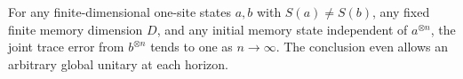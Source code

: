 \begin{proposition}\label{prop:entropy-density}
For any finite-dimensional one-site states $a,b$ with $S(a)\ne S(b)$, any fixed finite memory dimension $D$, and any initial memory state independent of $a^{\otimes n}$, the joint trace error from $b^{\otimes n}$ tends to one as $n\to\infty$. The conclusion even allows an arbitrary global unitary at each horizon.
\end{proposition}
